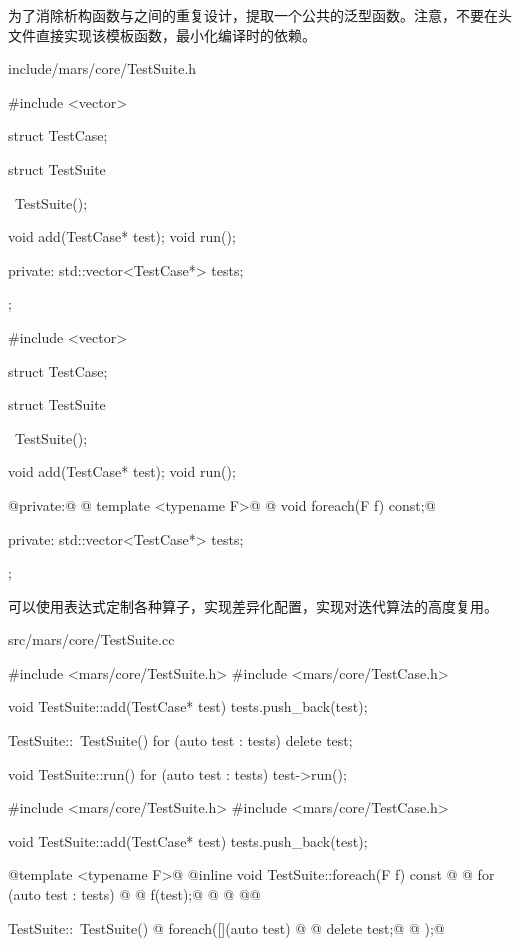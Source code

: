\begin{content}
为了消除析构函数与之间的重复设计，提取一个公共的泛型函数。注意，不要在头文件直接实现该模板函数，最小化编译时的依赖。

\begin{diff}{include/mars/core/TestSuite.h}
 \begin{minicpp}
#include <vector>

struct TestCase;

struct TestSuite {
  ~TestSuite();

  void add(TestCase* test);
  void run();

private:
  std::vector<TestCase*> tests;
};
 \end{minicpp}
\tcblower
 \begin{minicpp}
#include <vector>

struct TestCase;

struct TestSuite {
  ~TestSuite();

  void add(TestCase* test);
  void run();

@private:@
@  template <typename F>@
@  void foreach(F f) const;@

private:
  std::vector<TestCase*> tests;
};
 \end{minicpp}
\end{diff}

可以使用表达式定制各种算子，实现差异化配置，实现对迭代算法的高度复用。

\begin{diff}{src/mars/core/TestSuite.cc}
 \begin{minicpp}
#include <mars/core/TestSuite.h>
#include <mars/core/TestCase.h>

void TestSuite::add(TestCase* test) {
  tests.push_back(test);
}

TestSuite::~TestSuite() {
  for (auto test : tests) {
    delete test;
  }
}

void TestSuite::run() {
  for (auto test : tests) {
    test->run();
  }
}
 \end{minicpp}
\tcblower
 \begin{minicpp}
#include <mars/core/TestSuite.h>
#include <mars/core/TestCase.h>

void TestSuite::add(TestCase* test) {
  tests.push_back(test);
}

@template <typename F>@
@inline void TestSuite::foreach(F f) const {@
@  for (auto test : tests) {@
@    f(test);@
@  }@
@}@

TestSuite::~TestSuite() {
@  foreach([](auto test) {@
@    delete test;@
@  });@
}


\end{minicpp}
\end{diff}
\end{content}
